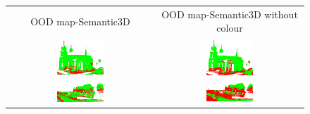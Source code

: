     \begin{figure}[h!]
        \centering
        \begin{tabular}{cc}
            OOD map-Semantic3D & OOD map-Semantic3D without colour \\
            \includegraphics[width=0.33\textwidth, height=0.18\textheight]{images/ood_imgs/sem3d_of/ent/de_sem3d_OOD_1.pdf}&
            \includegraphics[width=0.33\textwidth, height=0.18\textheight]{images/ood_imgs/sem3d_of/ent/de_sem3d_of_OOD_1.pdf}\\

            \includegraphics[width=0.33\textwidth, height=0.18\textheight]{images/ood_imgs/sem3d_of/ent/de_sem3d_OOD_2.pdf}&
            \includegraphics[width=0.33\textwidth, height=0.18\textheight]{images/ood_imgs/sem3d_of/ent/de_sem3d_of_OOD_2.pdf}\\


\end{tabular}
\end{figure}
